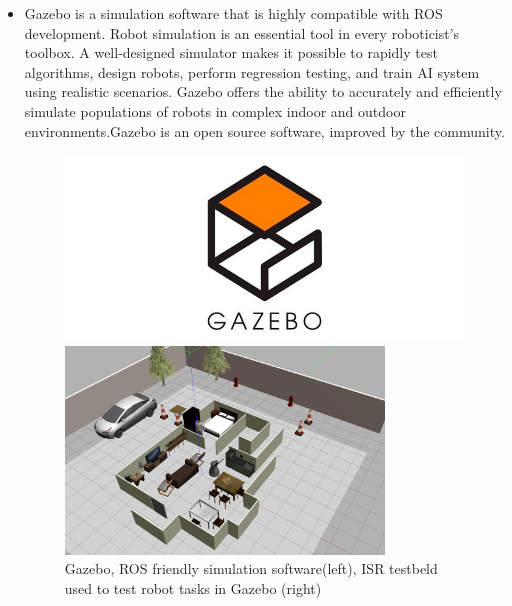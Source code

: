 \begin{itemize}
    \item 
Gazebo is a simulation software that is highly compatible with ROS development. Robot simulation is an essential tool in every roboticist's toolbox. A well-designed simulator makes it possible to rapidly test algorithms, design robots, perform regression testing, and train AI system using realistic scenarios. Gazebo offers the ability to accurately and efficiently simulate populations of robots in complex indoor and outdoor environments.Gazebo is an open source software, improved by the community.
\begin{figure} [!h]
    \begin{minipage}[b]{0.4\linewidth}
        \centering
        \includegraphics[width=1\textwidth]{images/gazebo.jpg}
    \end{minipage}
    \begin{minipage}[b]{0.6\linewidth}
      \begin{center}
        \includegraphics[width=0.8\textwidth]{images/gazebo_isr_testbeld.png}
      \end{center}
    \end{minipage}
    \caption{Gazebo, ROS friendly simulation software(left), ISR testbeld used to test robot tasks in Gazebo (right)}
\end{figure}

\end{itemize}
